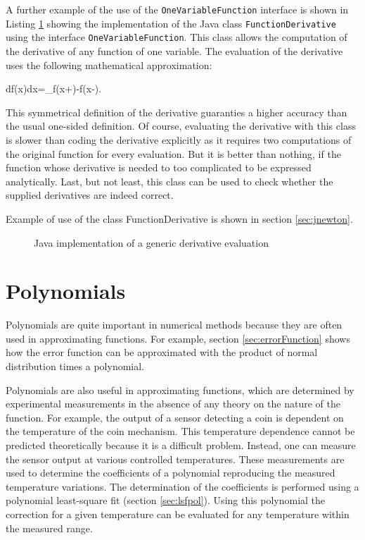 \documentclass[twoside]{book}
\begin{document}
A further example of the use of the {\tt OneVariableFunction}
interface is shown in Listing \ref{lj:derivative} showing the
implementation of the Java class {\tt FunctionDerivative} using
the interface {\tt OneVariableFunction}. This class allows the
computation of the derivative of any function of one variable. The
evaluation of the derivative uses the following mathematical
approximation:

\begin{mainEquation}
\label{eq:derivative} {df\left(x\right)\over dx}=\lim_{\epsilon{}}{f\left(x+\epsilon\right)-f\left(x-\epsilon\right)\epsilon}.
\end{mainEquation}
This symmetrical definition of the derivative guaranties a higher
accuracy than the usual one-sided definition. Of course,
evaluating the derivative with this class is slower than coding
the derivative explicitly as it requires two computations of the
original function for every evaluation. But it is better than
nothing, if the function whose derivative is needed to too
complicated to be expressed analytically. Last, but not least,
this class can be used to check whether the supplied derivatives
are indeed correct.

Example of use of the class FunctionDerivative is shown in section
\ref{sec:jnewton}.
\begin{figure}
\begin{listing}
\caption{Java implementation of a generic derivative evaluation}
\label{lj:derivative}

\end{listing}
\end{figure}

\section{Polynomials}
\label{sec:polynomial}
 Polynomials are quite important in
numerical methods because they are often used in approximating
functions. For example, section \ref{sec:errorFunction} shows how
the error function can be approximated with the product of normal
distribution times a polynomial.

Polynomials are also useful in approximating functions, which are
determined by experimental measurements in the absence of any
theory on the nature of the function. For example, the output of a
sensor detecting a coin is dependent on the temperature of the
coin mechanism. This temperature dependence cannot be predicted
theoretically because it is a difficult problem. Instead, one can
measure the sensor output at various controlled temperatures.
These measurements are used to determine the coefficients of a
polynomial reproducing the measured temperature variations. The
determination of the coefficients is performed using a polynomial
least-square fit (\cf section \ref{sec:lsfpol}). Using this
polynomial the correction for a given temperature can be evaluated
for any temperature within the measured range.
\end{document}
